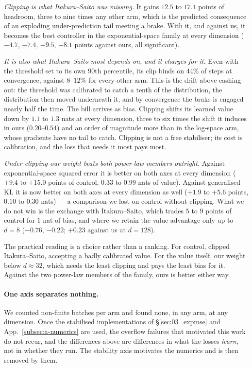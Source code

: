 

\emph{Clipping is what Itakura--Saito was missing.} It gains $12.5$ to $17.1$
points of headroom, three to nine times any other arm, which is the predicted
consequence of an exploding under-prediction tail meeting a brake. With it, and
against us, it becomes the best controller in the exponential-space family at
every dimension ($-4.7$, $-7.4$, $-9.5$, $-8.1$ points against ours, all
significant).

\emph{It is also what Itakura--Saito most depends on, and it charges for it.}
Even with the threshold set to its own $90$th percentile, its clip binds on
$44\%$ of steps at convergence, against $8$--$12\%$ for every other arm. This
is the drift above cashing out: the threshold was calibrated to catch a tenth
of the distribution, the distribution then moved underneath it, and by
convergence the brake is engaged nearly half the time. The bill arrives as
bias. Clipping shifts its
learned value down by $1.1$ to $1.3$ nats at every dimension, three to six times
the shift it induces in ours ($0.20$--$0.54$) and an order of magnitude more
than in the log-space arm, whose gradients have no tail to catch. Clipping is
not a free stabiliser; its cost is calibration, and the loss that needs it most
pays most.

\emph{Under clipping our weight beats both power-law members outright.}
Against exponential-space squared error it is better on both axes at every
dimension ($+9.4$ to $+15.0$ points of control, $0.33$ to $0.99$ nats of
value). Against generalised KL it is now better on both axes at every dimension
as well ($+1.9$ to $+5.6$ points, $0.10$ to $0.30$ nats) --- a comparison we
lost on control without clipping. What we do not win is the exchange with
Itakura--Saito, which trades $5$ to $9$ points of control for $1$ nat of bias,
and where we retain the value advantage only up to $d=8$ ($-0.76$, $-0.22$;
$+0.23$ against us at $d=128$).

The practical reading is a choice rather than a ranking. For control, clipped
Itakura--Saito, accepting a badly calibrated value. For the value itself, our
weight below $d\approx32$, which needs the least clipping and pays the least
bias for it. Against the two power-law members of the family, ours is better
either way.

\paragraph{One axis separates nothing.}
We counted non-finite batches per arm and found none, in any arm, at any
dimension. Once the stabilised implementations of \S\ref{sec:03_expmse} and
App.~\ref{subsec:a-numerics} are used, the overflow failures that motivated
this work do not recur, and the differences above are differences in what the
losses \emph{learn}, not in whether they run. The stability axis motivates the
numerics and is then removed by them.

